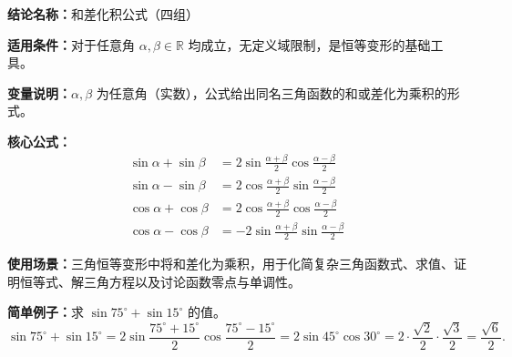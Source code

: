 \textbf{结论名称：}和差化积公式（四组）

\textbf{适用条件：}对于任意角 \(\alpha, \beta \in \mathbb{R}\) 均成立，无定义域限制，是恒等变形的基础工具。

\textbf{变量说明：}\(\alpha, \beta\) 为任意角（实数），公式给出同名三角函数的和或差化为乘积的形式。

\textbf{核心公式：}
\[
\boxed{
\begin{aligned}
\sin\alpha + \sin\beta &= 2\sin\frac{\alpha+\beta}{2}\cos\frac{\alpha-\beta}{2} \\[4pt]
\sin\alpha - \sin\beta &= 2\cos\frac{\alpha+\beta}{2}\sin\frac{\alpha-\beta}{2} \\[4pt]
\cos\alpha + \cos\beta &= 2\cos\frac{\alpha+\beta}{2}\cos\frac{\alpha-\beta}{2} \\[4pt]
\cos\alpha - \cos\beta &= -2\sin\frac{\alpha+\beta}{2}\sin\frac{\alpha-\beta}{2}
\end{aligned}
}
\]

\textbf{使用场景：}三角恒等变形中将和差化为乘积，用于化简复杂三角函数式、求值、证明恒等式、解三角方程以及讨论函数零点与单调性。

\textbf{简单例子：}求 \(\sin 75^\circ + \sin 15^\circ\) 的值。
\[
\sin 75^\circ + \sin 15^\circ = 2\sin\frac{75^\circ+15^\circ}{2}\cos\frac{75^\circ-15^\circ}{2}
= 2\sin 45^\circ \cos 30^\circ = 2 \cdot \frac{\sqrt{2}}{2} \cdot \frac{\sqrt{3}}{2} = \frac{\sqrt{6}}{2}.
\]